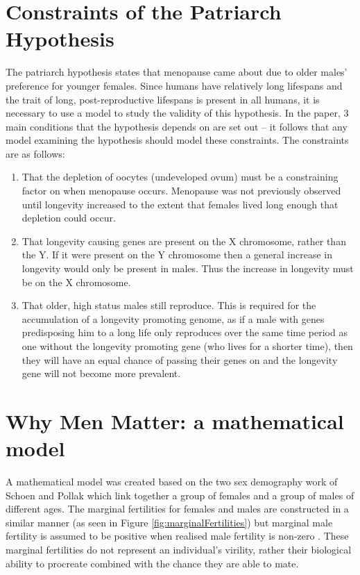 \documentclass[authoryearcitations]{UoYCSproject}
\begin{document}
\section{Constraints of the Patriarch Hypothesis}
The patriarch hypothesis \cite{patriarchHypothesis2000} states that menopause came about due to older males' preference for younger females. Since humans have relatively long lifespans and the trait of long, post-reproductive lifespans is present in all humans, it is necessary to use a model to study the validity of this hypothesis. In the paper, 3 main conditions that the hypothesis depends on are set out -- it follows that any model examining the hypothesis should model these constraints. The constraints are as follows:

\begin{enumerate}
\item That the depletion of oocytes (undeveloped ovum) must be a constraining factor on when menopause occurs. Menopause was not previously observed until longevity increased to the extent that females lived long enough that depletion could occur.

\item That longevity causing genes are present on the X chromosome, rather than the Y. If it were present on the Y chromosome then a general increase in longevity would only be present in males. Thus the increase in longevity must be on the X chromosome.

\item That older, high status males still reproduce. This is required for the accumulation of a longevity promoting genome, as if a male with genes predisposing him to a long life only reproduces over the same time period as one without the longevity promoting gene (who lives for a shorter time), then they will have an equal chance of passing their genes on and the longevity gene will not become more prevalent.

\end{enumerate}


\section{Why Men Matter: a mathematical model}
A mathematical model was created \cite{whyMenMatter2007} based on the two sex demography work of Schoen \cite{schoen1981harmonic} and Pollak \cite{pollak1990two} which link together a group of females and a group of males of different ages. The marginal fertilities for females and males are constructed in a similar manner (as seen in Figure \ref{fig:marginalFertilities}) but marginal male fertility is assumed to be positive when realised male fertility is non-zero . These marginal fertilities do not represent an individual's virility, rather their biological ability to procreate combined with the chance they are able to mate.
\end{document}
